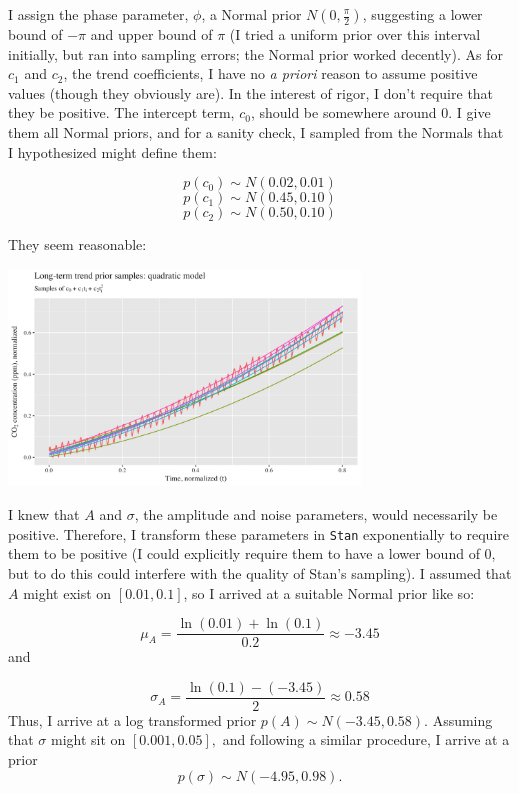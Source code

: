 \documentclass[]{article}
\let\origfigure=\figure
\let\endorigfigure=\endfigure
\renewenvironment{figure}[1][]{%
  \origfigure[H]
}{%
  \endorigfigure
}
\begin{document}
I assign the phase parameter, \(\phi\), a Normal prior
\(N(0, \frac{\pi}{2})\), suggesting a lower bound of \(-\pi\) and upper
bound of \(\pi\) (I tried a uniform prior over this interval initially,
but ran into sampling errors; the Normal prior worked decently). As for
\(c_1\) and \(c_2\), the trend coefficients, I have no \emph{a priori}
reason to assume positive values (though they obviously are). In the
interest of rigor, I don't require that they be positive. The intercept
term, \(c_0\), should be somewhere around 0. I give them all Normal
priors, and for a sanity check, I sampled from the Normals that I
hypothesized might define them:\newline

\[p(c_0) \sim N(0.02, 0.01)\] \[p(c_1) \sim N(0.45, 0.10)\]
\[p(c_2) \sim N(0.50, 0.10)\]\newline

They seem reasonable:

\begin{figure}
\centering
\includegraphics[width=0.7\textwidth]{mauna_loa/quad_prior_samples.png}
\caption{Quadratic model prior samples}
\end{figure}

I knew that \(A\) and \(\sigma\), the amplitude and noise parameters,
would necessarily be positive. Therefore, I transform these parameters
in \texttt{Stan} exponentially to require them to be positive (I could
explicitly require them to have a lower bound of 0, but to do this could
interfere with the quality of Stan's sampling). I assumed that \(A\)
might exist on \([0.01, 0.1]\), so I arrived at a suitable Normal prior
like so:\newline

\[ \mu_A = \frac{\ln(0.01) + \ln(0.1)}{0.2} \approx -3.45 \] and

\[ \sigma_A = \frac{\ln(0.1) - (-3.45)}{2} \approx 0.58 \] Thus, I
arrive at a log transformed prior \(p(A) \sim N(-3.45, 0.58).\) Assuming
that \(\sigma\) might sit on \([0.001, 0.05],\) and following a similar
procedure, I arrive at a prior \[ p(\sigma) \sim N(-4.95, 0.98). \]
\end{document}
